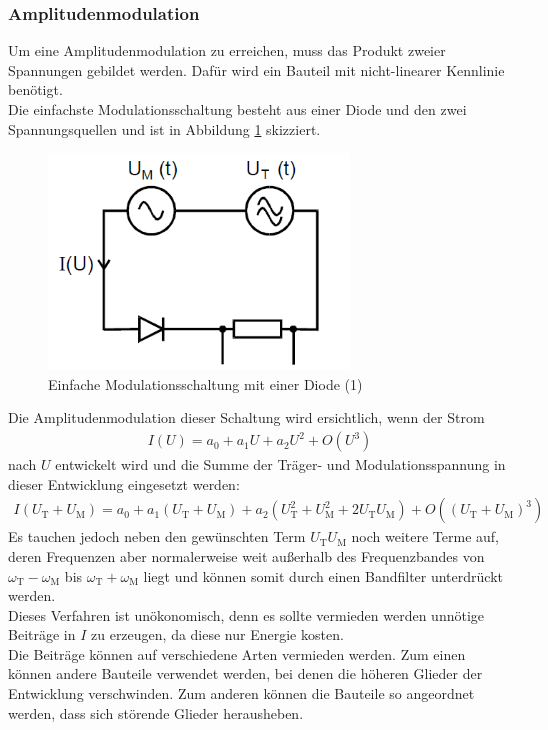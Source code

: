 \documentclass[]{scrartcl}
\begin{document}
\subsubsection*{Amplitudenmodulation}
Um eine Amplitudenmodulation zu erreichen, muss das Produkt zweier Spannungen gebildet werden. Dafür wird ein Bauteil mit nicht-linearer Kennlinie benötigt.\\
Die einfachste Modulationsschaltung besteht aus einer Diode und den zwei Spannungsquellen und ist in Abbildung \ref{fig:einfachemodulation} skizziert.
\begin{figure}[H]
\centering 
\includegraphics[width=8cm]{images/primitive_modulationsschaltung.png}
\caption{Einfache Modulationsschaltung mit einer Diode (1)}
\label{fig:einfachemodulation}
\end{figure} 
Die Amplitudenmodulation dieser Schaltung wird ersichtlich, wenn der Strom
\begin{align}
I\left(U\right)=a_0+a_1 U+a_2U^2 + O(U^3)
\end{align}
nach $U$ entwickelt wird und die Summe der Träger- und Modulationsspannung in dieser Entwicklung eingesetzt werden:
\begin{align}
I\left(U_{\text{T}}+U_{\text{M}}\right)=a_0+a_1\left(U_{\text{T}}+U_{\text{M}}\right)+a_2\left(U_{\text{T}}^2+U_{\text{M}}^2+2U_{\text{T}}U_{\text{M}}\right) + O(\left(U_{\text{T}}+U_{\text{M}}\right)^3)
\end{align}
Es tauchen jedoch neben den gewünschten Term $U_{\text{T}}U_{\text{M}}$ noch weitere Terme auf, deren Frequenzen aber normalerweise weit außerhalb des Frequenzbandes von $\omega_{\text{T}}-\omega_{\text{M}}$ bis $\omega_{\text{T}}+\omega_{\text{M}}$ liegt und können somit durch einen Bandfilter unterdrückt werden.\\
Dieses Verfahren ist unökonomisch, denn es sollte vermieden werden unnötige Beiträge in $I$ zu erzeugen, da diese nur Energie kosten.\\
Die Beiträge können auf verschiedene Arten vermieden werden. Zum einen können andere Bauteile verwendet werden, bei denen die höheren Glieder der Entwicklung verschwinden. Zum anderen können die Bauteile so angeordnet werden, dass sich störende Glieder herausheben.\\
\end{document}
